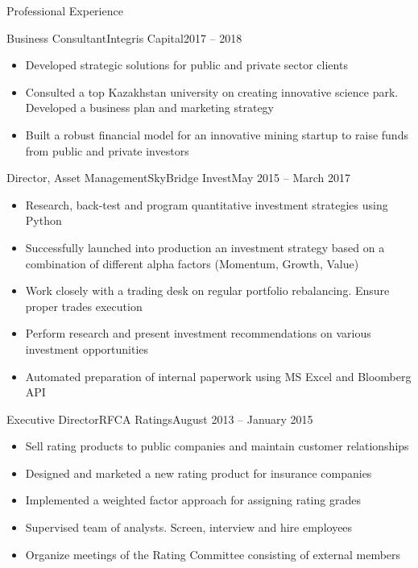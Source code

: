 \documentclass[]{mcdowellcv}
\begin{document}
\begin{cvsection}{Professional Experience}
  \begin{cvsubsection}{Business Consultant}{Integris Capital}{2017 -- 2018}	
    \begin{itemize}
      \item Developed strategic solutions for public and private sector clients
      \item Consulted a top Kazakhstan university on creating innovative science park. Developed a business plan and marketing strategy
      \item Built a robust financial model for an innovative mining startup to raise funds from public and private investors
    \end{itemize}
  \end{cvsubsection}

  \begin{cvsubsection}{Director, Asset Management}{SkyBridge Invest}{May 2015 -- March 2017}		
    \begin{itemize}
      \item Research, back-test and program quantitative investment strategies using Python
      \item Successfully launched into production an investment strategy based on a combination of different alpha factors (Momentum, Growth, Value)
      \item Work closely with a trading desk on regular portfolio rebalancing. Ensure proper trades execution
      \item Perform research and present investment recommendations on various investment opportunities
      \item Automated preparation of internal paperwork using MS Excel and Bloomberg API
    \end{itemize}
  \end{cvsubsection}

  \begin{cvsubsection}{Executive Director}{RFCA Ratings}{August 2013 -- January 2015}
    \begin{itemize}
      \item Sell rating products to public companies and maintain customer relationships
      \item Designed and marketed a new rating product for insurance companies
      \item Implemented a weighted factor approach for assigning rating grades
      \item Supervised team of analysts. Screen, interview and hire employees
      \item Organize meetings of the Rating Committee consisting of external members
    \end{itemize}
  \end{cvsubsection}


\end{cvsection}
\end{document}

